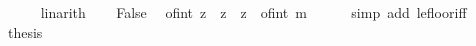 \begin{isabellebody}
\ \ \ \ \isamarkupfalse%
\ linarith\isanewline
\ \ \isamarkupfalse%
\ False\ \isamarkupfalse%
\ {\isachardoublequoteopen}{\isasymbar}of{\isacharunderscore}{\kern0pt}int\ {\isasymlfloor}z{\isasymrfloor}\ {\isacharminus}{\kern0pt}\ z{\isasymbar}\ {\isasymle}\ {\isasymbar}z\ {\isacharminus}{\kern0pt}\ of{\isacharunderscore}{\kern0pt}int\ m{\isasymbar}{\isachardoublequoteclose}\isanewline
\ \ \ \ \isamarkupfalse%
\ {\isacharparenleft}{\kern0pt}simp\ add{\isacharcolon}{\kern0pt}\ le{\isacharunderscore}{\kern0pt}floor{\isacharunderscore}{\kern0pt}iff{\isacharparenright}{\kern0pt}\isanewline
\ \ \isamarkupfalse%
\ \isamarkupfalse%
\ {\isacharquery}{\kern0pt}thesis\ \isacommand{{\isachardot}{\kern0pt}}\isamarkupfalse%
\isanewline
{}\isamarkupfalse%
%
\endisatagproof
{\isafoldproof}%
%
\isadelimproof
\isanewline
%
\endisadelimproof
%
\isadelimtheory
\isanewline
%
\endisadelimtheory
%
\isatagtheory
{}\isamarkupfalse%
%
\endisatagtheory
{\isafoldtheory}%
%
\isadelimtheory
%
\endisadelimtheory
%
\end{isabellebody}%
\endinput
